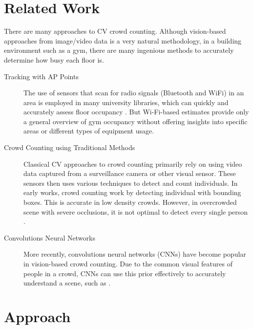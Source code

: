 \documentclass{article}
\begin{document}
\section{Related Work}
There are many approaches to CV crowd counting. Although vision-based approaches from image/video data is a very natural methodology, in a building environment such as a gym, there are many ingenious methods to accurately determine how busy each floor is.
\begin{description}
\item[Tracking with AP Points]  The use of sensors that scan for radio signals (Bluetooth and WiFi) in an area is employed in many university libraries, which can quickly and accurately assess floor occupancy \cite{waitz}. But Wi-Fi-based estimates provide only a general overview of gym occupancy without offering insights into specific areas or different types of equipment usage.
\item[Crowd Counting using Traditional Methods] Classical CV approaches to crowd counting primarily rely on using video data captured from a surveillance camera or other visual sensor. These sensors then uses various techniques to detect and count individuals. In early works, crowd counting work by detecting individual with bounding boxes. This is accurate in low density crowds. However, in overcrowded scene with severe occlusions, it is not optimal to detect every single person \cite{Zhiheng,4587569}.
\item[Convolutions Neural Networks]  More recently, convolutions neural networks (CNNs) have become popular in vision-based crowd counting. Due to the common visual features of people in a crowd, CNNs can use this prior effectively to accurately understand a scene, such as \cite{Ilyas2022,CNN}.
\end{description}

\section{Approach}
\end{document}
